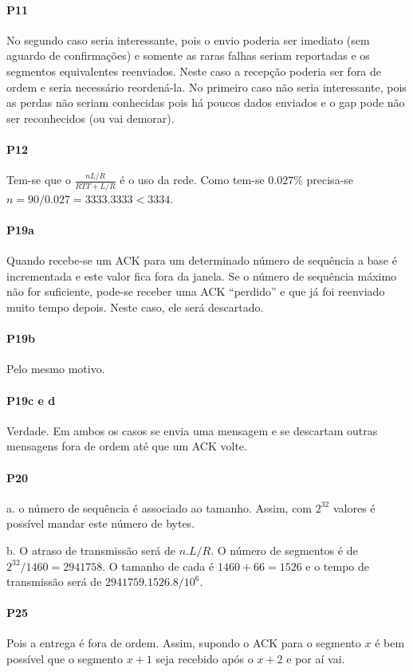 \paragraph{P11} No segundo caso seria interessante, pois o envio poderia ser imediato (sem aguardo de confirmações) e somente as raras falhas seriam reportadas e os segmentos equivalentes reenviados. Neste caso a recepção poderia ser fora de ordem e seria necessário reordená-la.
No primeiro caso não seria interessante, pois as perdas não seriam conhecidas pois há poucos dados enviados e o gap pode não ser reconhecidos (ou vai demorar).

\paragraph{P12} Tem-se que o $\frac{nL/R}{RTT + L/R}$ é o uso da rede. Como tem-se $0.027\%$ precisa-se $n = 90/0.027 = 3333.3333 < 3334$.

\paragraph{P19a} Quando recebe-se um ACK para um determinado número de sequência a base é incrementada e este valor fica fora da janela. Se o número de sequência máximo não for suficiente, pode-se receber uma ACK ``perdido'' e que já foi reenviado muito tempo depois. Neste caso, ele será descartado.

\paragraph{P19b} Pelo mesmo motivo.
\paragraph{P19c e d} Verdade. Em ambos os casos se envia uma mensagem e se descartam outras mensagens fora de ordem até que um ACK volte.

\paragraph{P20} a. o número de sequência é associado ao tamanho. Assim, com $2^{32}$ valores é possível mandar este número de bytes.

b. O atraso de transmissão será de $n.L/R$. O número de segmentos é de $2^{32}/1460 = 2941758$. O tamanho de cada é $1460 + 66 = 1526$ e o tempo de transmissão será de $2941759 . 1526 .8 / 10^6$.

\paragraph{P25} Pois a entrega é fora de ordem. Assim, supondo o ACK para o segmento $x$ é bem possível que o segmento $x+1$ seja recebido após o $x + 2$ e por aí vai.

